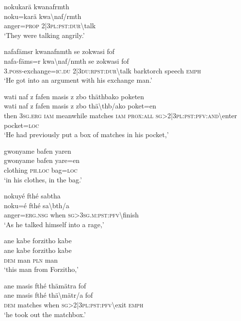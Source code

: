 \ea\label{ex:11:a2507}
nokukarä kwanafrmth\\
\gll noku=karä	kwa{\textbackslash}naf/rmth\\
     anger=\textsc{prop}	2|3\textsc{pl}:\textsc{pst}:\textsc{dur}{\textbackslash}talk\\
\glt `They were talking angrily.'
\z

\ea\label{ex:11:a2508}
nafafämsr kwanafnmth se zokwasi fof\\
\gll nafa-fäms=r	kwa{\textbackslash}naf/nmth	se	zokwasi	fof\\
     3.\textsc{poss}-exchange=\textsc{ic}.\textsc{du}	2|3\textsc{du}:\textsc{rpst}:\textsc{dur}{\textbackslash}talk	barktorch	speech	\textsc{emph}\\
\glt `He got into an argument with his exchange man.'
\z

\newpage
\ea\label{ex:11:a2509}
wati naf z fafen masis z zbo thäthbako poketen\\
\gll wati	naf	z	fafen	masis	z	zbo	thä{\textbackslash}thb/ako	poket=en\\
     then	3\textsc{sg}.\textsc{erg}	\textsc{iam}	meanwhile	matches	\textsc{iam}	\textsc{prox}:\textsc{all}	\textsc{sg}>2|3\textsc{pl}:\textsc{pst}:\textsc{pfv}:\textsc{and}{\textbackslash}enter	pocket=\textsc{loc}\\
\glt `He had previously put a box of matches in his pocket,'
\z

\ea\label{ex:11:a2511}
gwonyame bafen yaren\\
\gll gwonyame	bafen	yare=en\\
     clothing	\textsc{ph}.\textsc{loc}	bag=\textsc{loc}\\
\glt `in his clothes, in the bag.'
\z

\ea\label{ex:11:a2513}
nokuyé fthé sabtha\\
\gll noku=é	fthé	sa{\textbackslash}bth/a\\
     anger=\textsc{erg}.\textsc{nsg}	when	\textsc{sg}>3\textsc{sg}.\textsc{m}:\textsc{pst}:\textsc{pfv}{\textbackslash}finish\\
\glt `As he talked himself into a rage,'
\z

\ea\label{ex:11:a2514}
ane kabe forzitho kabe\\
\gll ane	kabe	forzitho	kabe\\
     \textsc{dem}	man	\textsc{pln}	man\\
\glt `this man from Forzitho,'
\z

\ea\label{ex:11:a2515}
ane masis fthé thämätra fof\\
\gll ane	masis	fthé	thä{\textbackslash}mätr/a	fof\\
     \textsc{dem}	matches	when	\textsc{sg}>2|3\textsc{pl}:\textsc{pst}:\textsc{pfv}{\textbackslash}exit	\textsc{emph}\\
\glt `he took out the matchbox.'
\z

